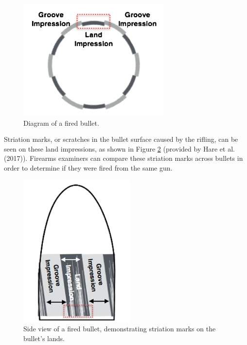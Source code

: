 \documentclass[print]{nuthesis}
\begin{document}
\begin{figure}

{\centering \includegraphics[width=0.5\linewidth]{images/bulletdiagram} 

}

\caption{Diagram of a fired bullet.}\label{fig:fireddiagram}
\end{figure}

Striation marks, or scratches in the bullet surface caused by the rifling, can be seen on these land impressions, as shown in Figure \ref{fig:firedland} (provided by Hare et al. (2017)).
Firearms examiners can compare these striation marks across bullets in order to determine if they were fired from the same gun.

\begin{figure}

{\centering \includegraphics[width=0.5\linewidth]{images/bulletland} 

}

\caption{Side view of a fired bullet, demonstrating striation marks on the bullet's lands.}\label{fig:firedland}
\end{figure}
\end{document}
